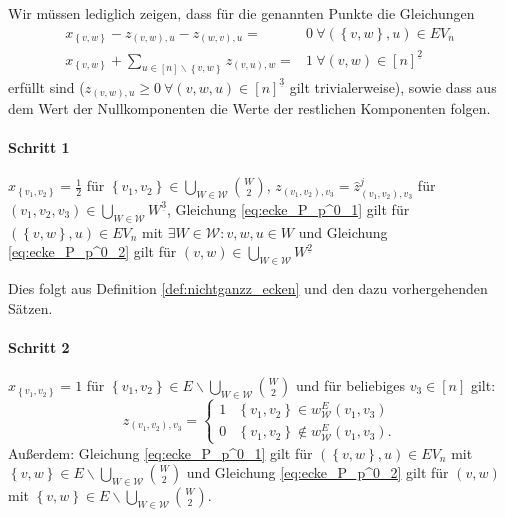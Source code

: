 \documentclass[10p,a4paper,BCOR = 12mm, DIV=15]{scrbook}
\begin{document}
\begin{bew}
Wir müssen lediglich zeigen, dass für die genannten Punkte die Gleichungen
\begin{align}
x_{\left\{v, w\right\}} - z_{\left(v, w\right), u} - z_{\left(w, v\right), u} = & 0\ \forall \left(\left\{v, w\right\}, u\right)\in EV_n \label{eq:ecke_P_p^0_1} \\
x_{\left\{v, w\right\}} + \sum_{u\in[n]\backslash\left\{v, w\right\}} z_{\left(v, u\right), w} = & 1\ \forall \left(v, w\right)\in [n]^{\underline{2}} \label{eq:ecke_P_p^0_2}
\end{align}
erfüllt sind ($z_{\left(v, w\right), u} \geq 0 \ \forall \left(v, w, u\right) \in \left[n\right]^{\underline{3}}$ gilt trivialerweise), sowie dass aus dem Wert der Nullkomponenten die Werte der restlichen Komponenten folgen.

\paragraph{Schritt 1} $x_{\left\{v_1, v_2\right\}} = \frac{1}{2}$ für $\left\{v_1, v_2\right\} \in \bigcup_{W \in \mathcal{W}} {W \choose 2}$, $z_{\left(v_1, v_2\right), v_3} = \widehat{z}^{j}_{\left(v_1, v_2\right), v_3}$ für $\left(v_1, v_2, v_3\right) \in \bigcup_{W \in \mathcal{W}} W^{\underline{3}}$, Gleichung \eqref{eq:ecke_P_p^0_1} gilt für $\left(\left\{v, w\right\}, u\right)\in EV_n$ mit $\exists W \in \mathcal{W}: v, w, u \in W$ und Gleichung \eqref{eq:ecke_P_p^0_2} gilt für $\left(v, w\right)\in \bigcup_{W \in \mathcal{W}} W^{\underline{2}}$

Dies folgt aus Definition \ref{def:nichtganzz_ecken} und den dazu vorhergehenden Sätzen.

\paragraph{Schritt 2} $x_{\left\{v_1, v_2\right\}} = 1$ für $\left\{v_1, v_2\right\} \in E \backslash \bigcup_{W \in \mathcal{W}} {W \choose 2}$ und für beliebiges $v_3 \in \left[n\right]$ gilt:
\begin{displaymath}
z_{\left(v_1, v_2\right), v_3} = \begin{cases}
1 & \left\{v_1, v_2\right\} \in w_{\mathcal{W}}^E\left(v_1, v_3\right) \\
0 & \left\{v_1, v_2\right\} \notin w_{\mathcal{W}}^E\left(v_1, v_3\right).
\end{cases}
\end{displaymath}
Außerdem: Gleichung \eqref{eq:ecke_P_p^0_1} gilt für $\left(\left\{v, w\right\}, u\right)\in EV_n$ mit $\left\{v, w\right\} \in E \backslash \bigcup_{W \in \mathcal{W}} {W \choose 2}$ und Gleichung \eqref{eq:ecke_P_p^0_2} gilt für $\left(v, w\right)$ mit $\left\{v, w\right\} \in E \backslash \bigcup_{W \in \mathcal{W}} {W \choose 2}$.


\end{bew}
\end{document}
